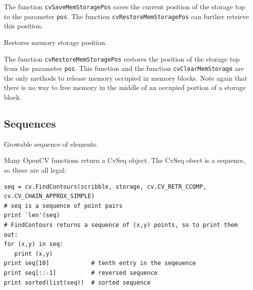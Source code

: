 \begin{description}
\end{description}

The function \texttt{cvSaveMemStoragePos} saves the current position
of the storage top to the parameter \texttt{pos}. The function
\texttt{cvRestoreMemStoragePos} can further retrieve this position.

\label{RestoreMemStoragePos}

Restores memory storage position.


\begin{description}
\end{description}

The function \texttt{cvRestoreMemStoragePos} restores the position of the storage top from the parameter \texttt{pos}. This function and the function \texttt{cvClearMemStorage} are the only methods to release memory occupied in memory blocks. Note again that there is no way to free memory in the middle of an occupied portion of a storage block.
\fi

\subsection{Sequences}

\label{CvSeq}

Growable sequence of elements.

\ifPython
Many OpenCV functions return a CvSeq object.  The CvSeq obect is a sequence, so these are all legal:
\begin{lstlisting}
seq = cv.FindContours(scribble, storage, cv.CV_RETR_CCOMP, cv.CV_CHAIN_APPROX_SIMPLE)
# seq is a sequence of point pairs
print `len'(seq)
# FindContours returns a sequence of (x,y) points, so to print them out:
for (x,y) in seq:
   print (x,y)
print seq[10]            # tenth entry in the seqeuence
print seq[::-1]          # reversed sequence
print sorted(list(seq))  # sorted sequence
\end{lstlisting}

